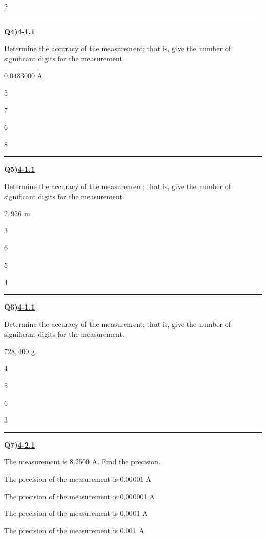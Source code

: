 \documentclass[11pt]{article}
\newenvironment{Qbox}[2]{%
  \par\medskip\noindent\begin{minipage}{\linewidth}%
  \hrule\medskip%
  \textbf{Q#1)}\hfill\textbf{\underline{#2}}\par\smallskip%
}{\par\end{minipage}\par\medskip}
\begin{document}
\begin{multicols}{2}
\begin{Qbox}{4}{4-1.1}
Determine the accuracy of the measurement; that is, give the number of significant digits for the measurement.\par\medskip $0.0483000$ A
\begin{choices}
  \item 5
  \item 7
  \item 6
  \item 8
\end{choices}
\end{Qbox}

\begin{Qbox}{5}{4-1.1}
Determine the accuracy of the measurement; that is, give the number of significant digits for the measurement.\par\medskip $2{,}936$ m
\begin{choices}
  \item 3
  \item 6
  \item 5
  \item 4
\end{choices}
\end{Qbox}

\begin{Qbox}{6}{4-1.1}
Determine the accuracy of the measurement; that is, give the number of significant digits for the measurement.\par\medskip $728{,}400$ g
\begin{choices}
  \item 4
  \item 5
  \item 6
  \item 3
\end{choices}
\end{Qbox}

\begin{Qbox}{7}{4-2.1}
The measurement is 8.2500 A. Find the precision.
\begin{choices}
  \item The precision of the measurement is 0.00001 A
  \item The precision of the measurement is 0.000001 A
  \item The precision of the measurement is 0.0001 A
  \item The precision of the measurement is 0.001 A
\end{choices}
\end{Qbox}


\end{multicols}
\end{document}
